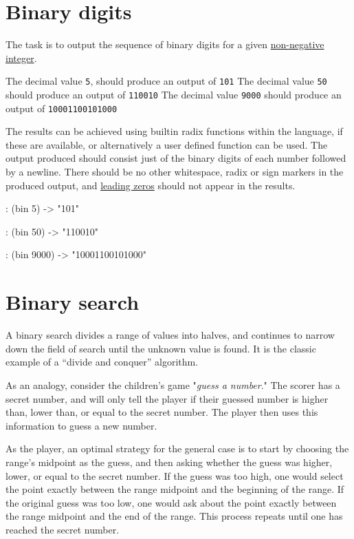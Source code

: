 \pagebreak{}
\section*{Binary digits}


The task is to output the sequence of binary digits for a given
\href{http://en.wikipedia.org/wiki/Natural\_number}{non-negative
integer}.

The decimal value \texttt{5}, should produce an output of \texttt{101}
The decimal value \texttt{50} should produce an output of
\texttt{110010} The decimal value \texttt{9000} should produce an output
of \texttt{10001100101000}

The results can be achieved using builtin radix functions within the
language, if these are available, or alternatively a user defined
function can be used. The output produced should consist just of the
binary digits of each number followed by a newline. There should be no
other whitespace, radix or sign markers in the produced output, and
\href{http://en.wikipedia.org/wiki/Leading\_zero}{leading zeros} should
not appear in the results.



\begin{wideverbatim}

: (bin 5)
-> "101"

: (bin 50)
-> "110010"

: (bin 9000)
-> "10001100101000"

\end{wideverbatim}

\pagebreak{}
\section*{Binary search}


A binary search divides a range of values into halves, and continues to
narrow down the field of search until the unknown value is found. It is
the classic example of a ``divide and conquer'' algorithm.

As an analogy, consider the children's game "\emph{guess a number}."
The scorer has a secret number, and will only tell the player if their
guessed number is higher than, lower than, or equal to the secret
number. The player then uses this information to guess a new number.

As the player, an optimal strategy for the general case is to start by
choosing the range's midpoint as the guess, and then asking whether the
guess was higher, lower, or equal to the secret number. If the guess was
too high, one would select the point exactly between the range midpoint
and the beginning of the range. If the original guess was too low, one
would ask about the point exactly between the range midpoint and the end
of the range. This process repeats until one has reached the secret
number.

